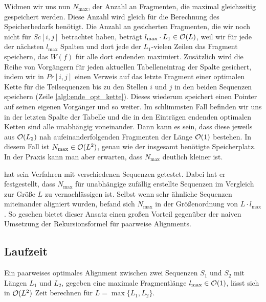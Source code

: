 Widmen wir uns nun $N_{\max}$, der Anzahl an Fragmenten, die maximal gleichzeitig gespeichert werden. Diese Anzahl wird gleich für die Berechnung des Speicherbedarfs benötigt. Die Anzahl an gesicherten Fragmenten, die wir noch nicht für $Sc[i,j]$ betrachtet haben, beträgt $l_{\max} \cdot L_1 \in \mathcal{O}(L)$, weil wir für jede der nächsten $l_{\max}$ Spalten und dort jede der $L_1$-vielen Zeilen das Fragment speichern, das $W(f)$ für alle dort endenden maximiert. Zusätzlich wird die Reihe von Vorgängern für jeden aktuellen Tabelleneintrag der Spalte gesichert, indem wir in $Pr[i,j]$ einen Verweis auf das letzte Fragment einer optimalen Kette für die Teilsequenzen bis zu den Stellen $i$ und $j$ in den beiden Sequenzen speichern (Zeile \ref{algl:ende_opt_kette}). Dieses wiederum speichert einen Pointer auf seinen eigenen Vorgänger und so weiter. Im schlimmsten Fall befinden wir uns in der letzten Spalte der Tabelle und die in den Einträgen endenden optimalen Ketten sind alle unabhängig voneinander. Dann kann es sein, dass diese jeweils aus $\mathcal{O}(L_2)$ nah aufeinanderfolgenden Fragmenten der Länge $\mathcal{O}(1)$ bestehen. In diesem Fall ist $N_{\max} \in \mathcal{O}(L^2)$, genau wie der insgesamt benötigte Speicherplatz. In der Praxis kann man aber erwarten, dass $N_{\max}$ deutlich kleiner ist. 

\cite{m02} hat sein Verfahren mit verschiedenen Sequenzen getestet. Dabei hat er festgestellt, dass $N_{\max}$ für unabhängige zufällig erstellte Sequenzen im Vergleich zur Größe $L$ zu vernachlässigen ist. Selbst wenn sehr ähnliche Sequenzen miteinander aligniert wurden, befand sich $N_{\max}$ in der Größenordnung von $L \cdot l_{\max}$. So gesehen bietet dieser Ansatz einen großen Vorteil gegenüber der naiven Umsetzung der Rekursionsformel für paarweise Alignments.

\subsection{Laufzeit}

\begin{satz}[\cite{m02}]\label{satz:pairwise}
	Ein paarweises optimales Alignment zwischen zwei Sequenzen $S_1$ und $S_2$ mit Längen $L_1$ und $L_2$, gegeben eine maximale Fragmentlänge $l_{\max} \in \mathcal{O}(1)$, lässt sich in $\mathcal{O}(L^2)$ Zeit berechnen für $L = \max\{L_1, L_2\}$.
\end{satz}

